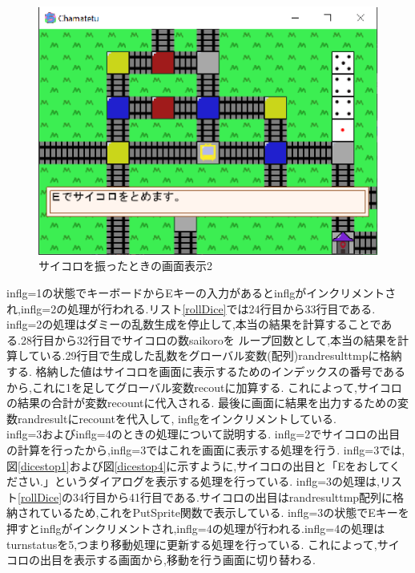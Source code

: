 \documentclass[a4j]{jarticle}
\begin{document}
            \begin{figure}[H]
            \centering
            \includegraphics[scale=1.3]{saikoro4.eps}
            \caption{サイコロを振ったときの画面表示2}
             \label{rolldice2}
            \end{figure}   

        inflg=1の状態でキーボードからEキーの入力があるとinflgがインクリメントされ,inflg=2の処理が行われる.リスト\ref{rollDice}では24行目から33行目である.
        inflg=2の処理はダミーの乱数生成を停止して,本当の結果を計算することである.28行目から32行目でサイコロの数saikoroを
        ループ回数として,本当の結果を計算している.29行目で生成した乱数をグローバル変数(配列)randresulttmpに格納する. 
        格納した値はサイコロを画面に表示するためのインデックスの番号であるから,これに1を足してグローバル変数recoutに加算する.
        これによって,サイコロの結果の合計が変数recountに代入される. 最後に画面に結果を出力するための変数randresultにrecountを代入して,
        inflgをインクリメントしている. \\
        inflg=3およびinflg=4のときの処理について説明する. inflg=2でサイコロの出目の計算を行ったから,inflg=3ではこれを画面に表示する処理を行う.
        inflg=3では,図\ref{dicestop1}および図\ref{dicestop4}に示すように,サイコロの出目と「Eをおしてください.」というダイアログを表示する処理を行っている.
        inflg=3の処理は,リスト\ref{rollDice}の34行目から41行目である.サイコロの出目はrandresulttmp配列に格納されているため,これをPutSprite関数で表示している.
        inflg=3の状態でEキーを押すとinflgがインクリメントされ,inflg=4の処理が行われる.inflg=4の処理はturnstatusを5,つまり移動処理に更新する処理を行っている.
        これによって,サイコロの出目を表示する画面から,移動を行う画面に切り替わる.
\end{document}
